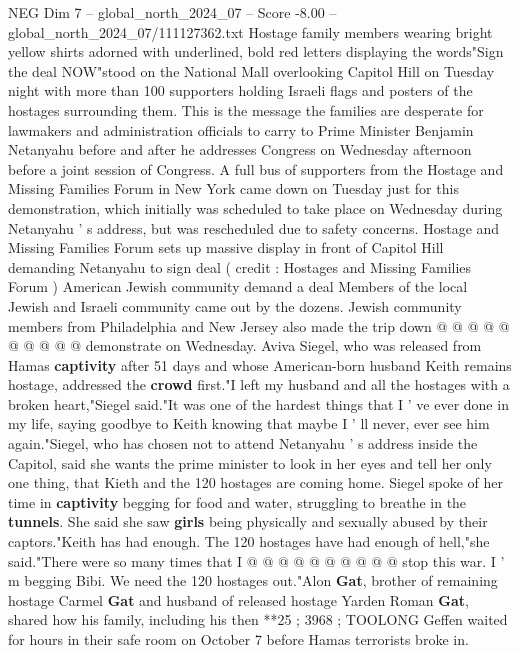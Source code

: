 \begin{textsample}{NEG Dim 7 – global\_north\_2024\_07 – Score -8.00 – global\_north\_2024\_07/111127362.txt}  \label{ex:f7_neg_112}
Hostage family members wearing bright yellow shirts adorned with underlined, bold red letters displaying the words"Sign the deal NOW"stood on the National Mall overlooking Capitol Hill on Tuesday night with more than 100 supporters holding Israeli flags and posters of the hostages surrounding them.
This is the message the families are desperate for lawmakers and administration officials to carry to Prime Minister Benjamin Netanyahu before and after he addresses Congress on Wednesday afternoon before a joint session of Congress.
A full bus of supporters from the Hostage and Missing Families Forum in New York came down on Tuesday just for this demonstration, which initially was scheduled to take place on Wednesday during Netanyahu ' s address, but was rescheduled due to safety concerns.
Hostage and Missing Families Forum sets up massive display in front of Capitol Hill demanding Netanyahu to sign deal ( credit : Hostages and Missing Families Forum ) American Jewish community demand a deal Members of the local Jewish and Israeli community came out by the dozens.
Jewish community members from Philadelphia and New Jersey also made the trip down @ @ @ @ @ @ @ @ @ @ demonstrate on Wednesday.
Aviva Siegel, who was released from Hamas \textbf{captivity} after 51 days and whose American-born husband Keith remains hostage, addressed the \textbf{crowd} first."I left my husband and all the hostages with a broken heart,"Siegel said."It was one of the hardest things that I ' ve ever done in my life, saying goodbye to Keith knowing that maybe I ' ll never, ever see him again."Siegel, who has chosen not to attend Netanyahu ' s address inside the Capitol, said she wants the prime minister to look in her eyes and tell her only one thing, that Kieth and the 120 hostages are coming home.
Siegel spoke of her time in \textbf{captivity} begging for food and water, struggling to breathe in the \textbf{tunnels}.
She said she saw \textbf{girls} being physically and sexually abused by their captors."Keith has had enough.
The 120 hostages have had enough of hell,"she said."There were so many times that I @ @ @ @ @ @ @ @ @ @ stop this war.
I ' m begging Bibi.
We need the 120 hostages out."Alon \textbf{Gat}, brother of remaining hostage Carmel \textbf{Gat} and husband of released hostage Yarden Roman \textbf{Gat}, shared how his family, including his then **25 ; 3968 ; TOOLONG Geffen waited for hours in their safe room on October 7 before Hamas terrorists broke in.

\end{textsample}
